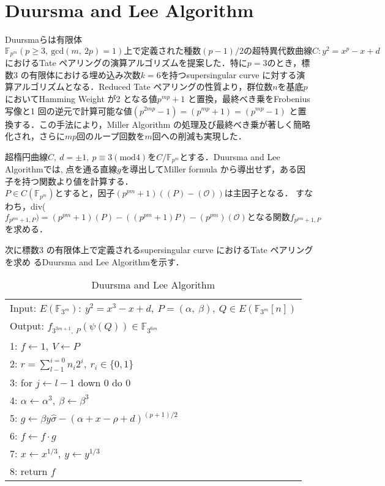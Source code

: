 \section{Duursma and Lee Algorithm}
Duursmaらは有限体$\mathbb{F}_{p^m}(p \ge 3,\ \mbox{gcd}(m,\ 2p) = 1) 上で定義された種数(p-1)/2 の超特異代数曲線C : y^2 = x^p - x + d$におけるTate ペアリングの演算アルゴリズム\cite{Duu}を提案した．特に$p = 3$のとき，標数3 の有限体における埋め込み次数$k = 6$を持つsupersingular curve に対する演算アルゴリズムとなる．Reduced Tate ペアリングの性質より，群位数$n$を基底$p$においてHamming Weight が2 となる値$p^{mp} + 1$ と置換，最終べき乗をFrobenius 写像と1 回の逆元で計算可能な値$(p^{2mp} - 1)=(p^{mp} +1) = (p^{mp} - 1)$ と置換する．この手法により，Miller Algorithm の処理及び最終べき乗が著しく簡略化され，さらに$mp$回のループ回数を$m$回への削減も実現した．
\par
超楕円曲線$C,\ d = \pm1,\ p \equiv 3 (\mbox{mod} 4) をC/\mathbb{F}_{p^m} $とする．Duursma and Lee Algorithmでは, 点を通る直線$g$を導出してMiller formula から導出せず，ある因子を持つ関数より値を計算する．$P \in C(\mathbb{F}_{p^m}) とすると，因子(p^{pm} + 1)((P) - (\mathcal{O})) $は主因子となる．
すなわち，div($f_{p^{pm}+1,P} ) = (p^{pm} +1)(P) - ((p^{pm} + 1)P) - (p^{pm})(\mathcal{O}) となる関数f_{p^{pm}+1,P} $を求める．
\par
次に標数3 の有限体上で定義されるsupersingular curve におけるTate ペアリングを求め
るDuursma and Lee Algorithmを示す．
\par
\begin{table}[htbp]
 \begin{center}
  \begin{tabular}{|l|}
     \hline
     Input: $E(\mathbb{F}_{3^m}):\ y^2 = x^3 - x + d,\ P=(\alpha,\ \beta),\ Q \in E(\mathbb{F}_{3^m}[n])$\\
     Output: $f_{3^{3m + 1},\ P}(\psi (Q)) \in \mathbb{F}_{3^{6m}}$\\
     \hline
     1: \quad $f \gets 1,\ V \gets P$\\
     2: \quad $r=\sum_{l - 1}^{i = 0} n_i 2^i, \ r_i \in \{0,1\}$\\
     3: \quad for $j \gets l - 1$ down 0 do 0\\
     4: \quad \quad $\alpha \gets \alpha ^3,\ \beta \gets \beta ^3$\\
     5: \quad \quad $g \gets \beta y \hat{\sigma}-(\alpha +x-\rho +d)^{(p+1)/2}$\\
     6: \quad \quad $f \gets f \cdot g$\\
     7: \quad \quad $x \gets x^{1/3},\ y \gets y^{1/3}$\\
     8: \quad return $f$\\
     \hline
  \end{tabular}
 \end{center}
 \caption{Duursma and Lee Algorithm}
\end{table}
\par